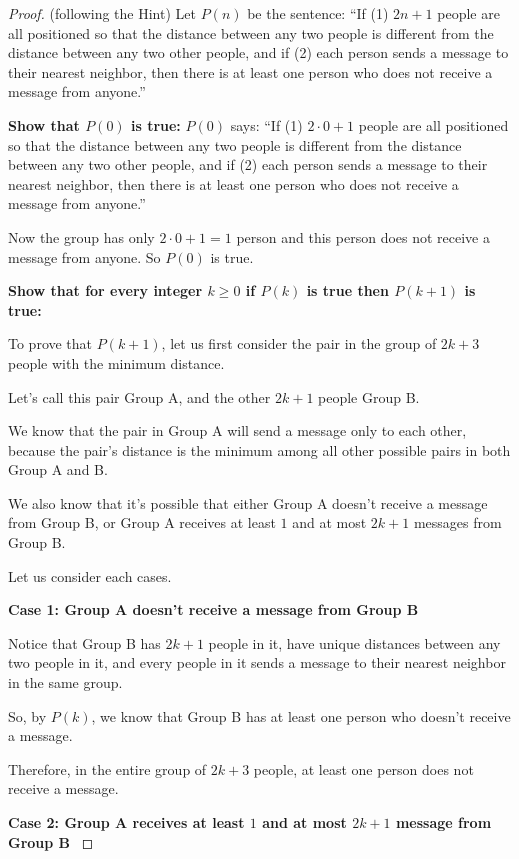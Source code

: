 \documentclass[14pt]{extarticle}
\begin{document}
\begin{proof}
    (following the Hint) Let $P(n)$ be the sentence: ``If (1) $2n + 1$ people are all positioned so that the distance between any two people is different from the distance between any two other people, and if (2) each person sends a message to their nearest neighbor, then there is at least one person who does not receive a message from anyone.''

    {\bf Show that $P(0)$ is true:} $P(0)$ says: ``If (1) $2 \cdot 0 + 1$ people are all positioned so that the distance between any two people is different from the distance between any two other people, and if (2) each person sends a message to their nearest neighbor, then there is at least one person who does not receive a message from anyone.''

    Now the group has only $2 \cdot 0 + 1 = 1$ person and this person does not receive a message from anyone. So $P(0)$ is true.

    {\bf Show that for every integer $k \geq 0$ if $P(k)$ is true then $P(k+1)$ is true:}

    To prove that $P(k+1)$, let us first consider the pair in the group of $2k+3$ people with the minimum distance.

    Let's call this pair Group A, and the other $2k+1$ people Group B.

    We know that the pair in Group A will send a message only to each other, because the pair's distance is the minimum among all other possible pairs in both Group A and B.

    We also know that it's possible that either Group A doesn't receive a message from Group B, or Group A receives at least $1$ and at most $2k+1$ messages from Group B.

    Let us consider each cases.

    {\bf Case 1: Group A doesn't receive a message from Group B}

    Notice that Group B has $2k+1$ people in it, have unique distances between any two people in it, and every people in it sends a message to their nearest neighbor in the same group.

    So, by $P(k)$, we know that Group B has at least one person who doesn't receive a message.

    Therefore, in the entire group of $2k+3$ people, at least one person does not receive a message.

    {\bf Case 2: Group A receives at least $1$ and at most $2k+1$ message from Group B }


\end{proof}
\end{document}

